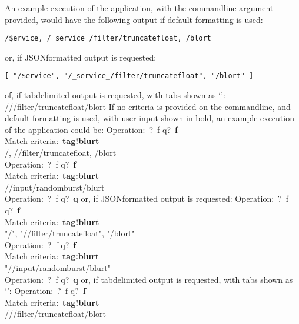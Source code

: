 An example execution of the application, with the command\longDash{}line argument
 provided, would have the following output if default formatting is
used:
\outputBegin
\begin{verbatim}
/$ervice, /_service_/filter/truncatefloat, /blort
\end{verbatim}
\outputEnd
\condPage{}
or, if JSON\longDash{}formatted output is requested:
\outputBegin
\begin{verbatim}
[ "/$ervice", "/_service_/filter/truncatefloat", "/blort" ]
\end{verbatim}
\outputEnd{}
of, if tab\longDash{}delimited output is requested, with tabs shown as `\tabSymbol':
\outputBegin{}
/\dollarService\pseudotab/\serviceName/filter/truncatefloat\pseudotab/blort
\outputEnd{}
If no criteria is provided on the command\longDash{}line, and default formatting is used,
with user input shown in bold, an example execution of the application could be:
\outputBegin{}
Operation:\ \openSq{}?\ f q\closeSq{}?\ \textbf{f}\\
Match criteria:\ \textbf{tag!blurt}\\
/\dollarService, /\serviceName/filter/truncatefloat, /blort\\
Operation:\ \openSq{}?\ f q\closeSq{}?\ \textbf{f}\\
Match criteria:\ \textbf{tag:blurt}\\
/\serviceName/input/randomburst/blurt\\
Operation:\ \openSq{}?\ f q\closeSq{}?\ \textbf{q}
\outputEnd{}
or, if JSON\longDash{}formatted output is requested:
\outputBegin{}
Operation:\ \openSq{}?\ f q\closeSq{}?\ \textbf{f}\\
Match criteria:\ \textbf{tag!blurt}\\
\openSq{} "/\dollarService", "/\serviceName/filter/truncatefloat", "/blort" \closeSq\\
Operation:\ \openSq{}?\ f q\closeSq{}?\ \textbf{f}\\
Match criteria:\ \textbf{tag:blurt}\\
\openSq{} "/\serviceName/input/randomburst/blurt" \closeSq\\
Operation:\ \openSq{}?\ f q\closeSq{}?\ \textbf{q}
\outputEnd{}
or, if tab\longDash{}delimited output is requested, with tabs shown as `\tabSymbol':
\outputBegin{}
Operation:\ \openSq{}?\ f q\closeSq{}?\ \textbf{f}\\
Match criteria:\ \textbf{tag!blurt}\\
/\dollarService\pseudotab/\serviceName/filter/truncatefloat\pseudotab/blort\\

